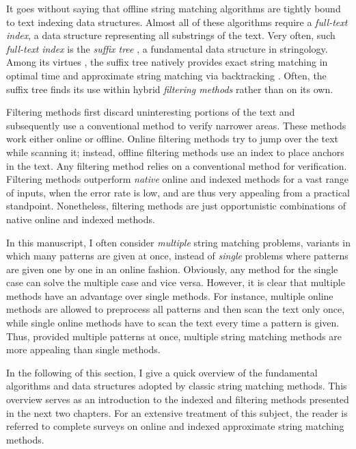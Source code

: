 It goes without saying that offline string matching algorithms are tightly bound to text indexing data structures.
Almost all of these algorithms require a \emph{full-text index}, \ie a data structure representing all substrings of the text.
Very often, such \emph{full-text index} is the \emph{suffix tree} \citep{Weiner1973}, a fundamental data structure in stringology.
Among its virtues \citep{Apostolico1985}, the suffix tree natively provides exact string matching in optimal time and approximate string matching via backtracking \citep{Ukkonen1993}.
Often, the suffix tree finds its use within hybrid \emph{filtering methods} rather than on its own.

Filtering methods first discard uninteresting portions of the text and subsequently use a conventional method to verify narrower areas.
These methods work either online or offline.
Online filtering methods try to jump over the text while scanning it; instead, offline filtering methods use an index to place anchors in the text.
Any filtering method relies on a conventional method for verification.
Filtering methods outperform \emph{native} online and indexed methods for a vast range of inputs, \ie when the error rate is low, and are thus very appealing from a practical standpoint.
Nonetheless, filtering methods are just opportunistic combinations of native online and indexed methods.

In this manuscript, I often consider \emph{multiple} string matching problems, \ie variants in which many patterns are given at once, instead of \emph{single} problems where patterns are given one by one in an online fashion.
Obviously, any method for the single case can solve the multiple case and vice versa.
However, it is clear that multiple methods have an advantage over single methods.
For instance, multiple online methods are allowed to preprocess all patterns and then scan the text only once, while single online methods have to scan the text every time a pattern is given.
Thus, provided multiple patterns at once, multiple string matching methods are more appealing than single methods.

In the following of this section, I give a quick overview of the fundamental algorithms and data structures adopted by classic string matching methods.
This overview serves as an introduction to the indexed and filtering methods presented in the next two chapters.
For an extensive treatment of this subject, the reader is referred to complete surveys on online \citep{Navarro2001a} and indexed \citep{Navarro2001} approximate string matching methods.

